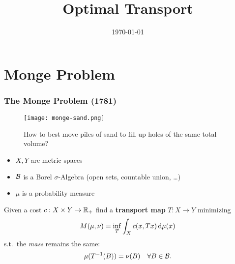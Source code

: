 \documentclass{beamer}
\title{Optimal Transport}
\date{\today}
\begin{document}
\maketitle
\frame{\tableofcontents[currentsection]}

\section{Monge Problem}%
\label{sec:}

\begin{frame}
  \frametitle{The Monge Problem (1781)}

  \begin{minipage}{0.5\textwidth}
    \begin{figure}[ht]
      \centering
      \texttt{[image: monge-sand.png]}
      \caption{How to best move piles of sand to fill up holes of the same total volume?\label{fig:label} }
    \end{figure}
  \end{minipage}
  \hfill
  \begin{minipage}{0.45\textwidth}
    \begin{itemize}
      \item $X,Y$ are metric spaces
      \item $\mathcal{B}$ is a Borel $\sigma$-Algebra (open sets, countable union, \dots)
      \item $\mu$ is a probability measure
    \end{itemize}
  Given a cost $c: X\times Y \to \mathbb{R}_+$ find a \textbf{transport map} $T: X \to Y$ minimizing
  \begin{equation}
    M(\mu, \nu) = \inf_T \int_X c(x, Tx) \mathop{}\!\mathrm{d} \mu(x)
  \end{equation}
  s.t.\ the \emph{mass} remains the same:
  \begin{equation}
    \mu(T^{-1}(B)) = \nu(B) \quad \forall B \in \mathcal{B}.
  \end{equation}
  \end{minipage}
\end{frame}
\end{document}
